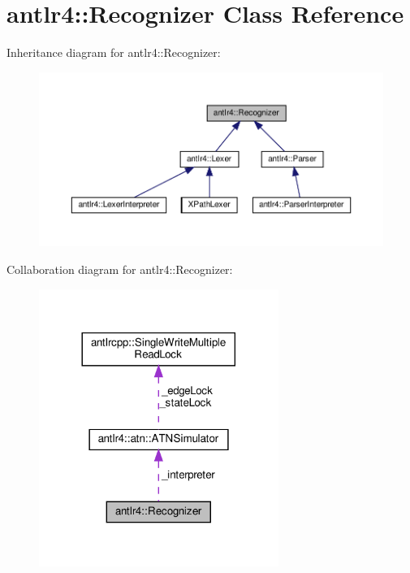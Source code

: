\hypertarget{classantlr4_1_1Recognizer}{}\section{antlr4\+:\+:Recognizer Class Reference}
\label{classantlr4_1_1Recognizer}


Inheritance diagram for antlr4\+:\+:Recognizer\+:
\nopagebreak
\begin{figure}[H]
\begin{center}
\leavevmode
\includegraphics[width=350pt]{classantlr4_1_1Recognizer__inherit__graph}
\end{center}
\end{figure}


Collaboration diagram for antlr4\+:\+:Recognizer\+:
\nopagebreak
\begin{figure}[H]
\begin{center}
\leavevmode
\includegraphics[width=221pt]{classantlr4_1_1Recognizer__coll__graph}
\end{center}
\end{figure}
